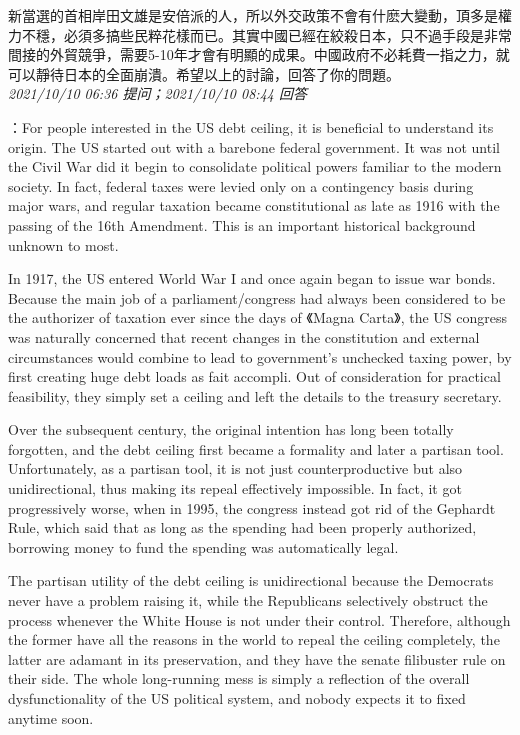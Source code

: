 \documentclass[twocolumn]{ctexart}
\begin{document}
新當選的首相岸田文雄是安倍派的人，所以外交政策不會有什麽大變動，頂多是權力不穩，必須多搞些民粹花樣而已。其實中國已經在絞殺日本，只不過手段是非常間接的外貿競爭，需要5-10年才會有明顯的成果。中國政府不必耗費一指之力，就可以靜待日本的全面崩潰。希望以上的討論，回答了你的問題。
\\

\textit{\hfill\noindent\small 2021/10/10 06:36 提问；2021/10/10 08:44 回答}

：For people interested in the US debt ceiling, it is beneficial to understand its origin. The US started out with a barebone federal government. It was not until the Civil War did it begin to consolidate political powers familiar to the modern society. In fact, federal taxes were levied only on a contingency basis during major wars, and regular taxation became constitutional as late as 1916 with the passing of the 16th Amendment. This is an important historical background unknown to most.

In 1917, the US entered World War I and once again began to issue war bonds. Because the main job of a parliament/congress had always been considered to be the authorizer of taxation ever since the days of 《Magna Carta》, the US congress was naturally concerned that recent changes in the constitution and external circumstances would combine to lead to government's unchecked taxing power, by first creating huge debt loads as fait accompli. Out of consideration for practical feasibility, they simply set a ceiling and left the details to the treasury secretary.

Over the subsequent century, the original intention has long been totally forgotten, and the debt ceiling first became a formality and later a partisan tool. Unfortunately, as a partisan tool, it is not just counterproductive but also unidirectional, thus making its repeal effectively impossible. In fact, it got progressively worse, when in 1995, the congress instead got rid of the Gephardt Rule, which said that as long as the spending had been properly authorized, borrowing money to fund the spending was automatically legal.

The partisan utility of the debt ceiling is unidirectional because the Democrats never have a problem raising it, while the Republicans selectively obstruct the process whenever the White House is not under their control. Therefore, although the former have all the reasons in the world to repeal the ceiling completely, the latter are adamant in its preservation, and they have the senate filibuster rule on their side. The whole long-running mess is simply a reflection of the overall dysfunctionality of the US political system, and nobody expects it to fixed anytime soon.
\\
\end{document}
